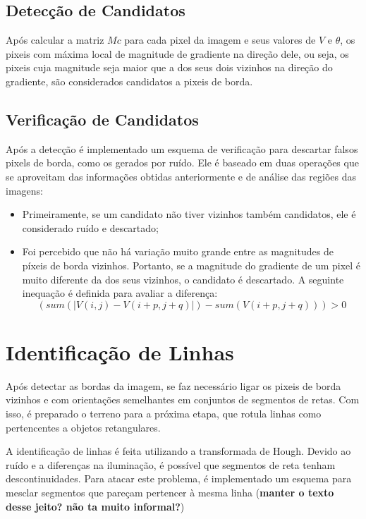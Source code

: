 \subsection{Detecção de Candidatos}

Após calcular a matriz $Mc$ para cada pixel da imagem e seus valores de $V$ e $\theta$, os pixeis com máxima local de magnitude de gradiente na direção dele, ou seja, os pixeis cuja magnitude seja maior que a dos seus dois vizinhos na direção do gradiente, são considerados candidatos a pixeis de borda.

\subsection{Verificação de Candidatos}

Após a detecção é implementado um esquema de verificação para descartar falsos pixels de borda, como os gerados por ruído. Ele é baseado em duas operações que se aproveitam das informações obtidas anteriormente e de análise das regiões das imagens:

\begin{itemize}
\item Primeiramente, se um candidato não tiver vizinhos também candidatos, ele é considerado ruído e descartado;
\item Foi percebido que não há variação muito grande entre as magnitudes de píxeis de borda vizinhos. Portanto, se a magnitude do gradiente de um pixel é muito diferente da dos seus vizinhos, o candidato é descartado. A seguinte inequação é definida para avaliar a diferença:
$$ (sum(| V(i,j) - V(i+p,j+q) |)- sum(V(i+p,j+q))) >0$$
\end {itemize}

\section{Identificação de Linhas}

Após detectar as bordas da imagem, se faz necessário ligar os pixeis de borda vizinhos e com orientações semelhantes em conjuntos de segmentos de retas. Com isso, é preparado o terreno para a próxima etapa, que rotula linhas como pertencentes a objetos retangulares. 

A identificação de linhas é feita utilizando a transformada de Hough. Devido ao ruído e a diferenças na iluminação, é possível que segmentos de reta tenham descontinuidades. Para atacar este problema, é implementado um esquema para mesclar segmentos que pareçam pertencer à mesma linha (\textbf{manter o texto desse jeito? não ta muito informal?})

